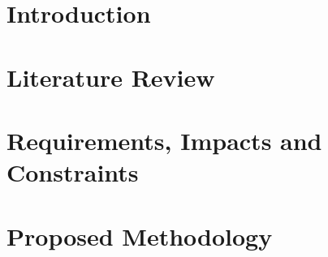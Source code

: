 \documentclass[12pt,oneside,openany]{report}
\begin{document}
\setlength{\parskip}{1em}
\hfuzz=3pt

\chapter{Introduction}
\label{ch:intro}


\chapter{Literature Review}
\label{ch:lit}


\chapter{Requirements, Impacts and Constraints}
\label{ch:req}


\chapter{Proposed Methodology}
\label{ch:method}






\clearpage
{}
{}
\printbibliography
\end{document}
